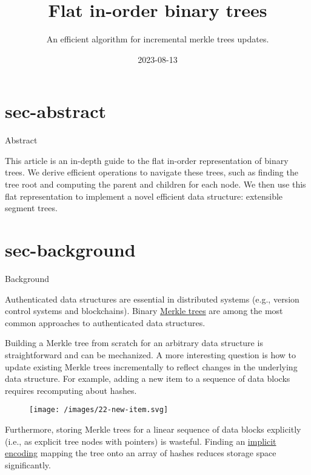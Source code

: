 \documentclass{article}
\title{Flat in-order binary trees}
\subtitle{An efficient algorithm for incremental merkle trees updates.}
\date{2023-08-13}
\begin{document}
\section{sec-abstract}{Abstract}

This article is an in-depth guide to the flat in-order representation of binary trees.
We derive efficient operations to navigate these trees, such as finding the tree root and computing the parent and children for each node.
We then use this flat representation to implement a novel efficient data structure: extensible segment trees.

\section{sec-background}{Background}

Authenticated data structures are essential in distributed systems (e.g., version control systems and blockchains).
Binary \href{https://en.wikipedia.org/wiki/Merkle_tree}{Merkle trees} are among the most common approaches to authenticated data structures.

Building a Merkle tree from scratch for an arbitrary data structure is straightforward and can be mechanized.
A more interesting question is how to update existing Merkle trees incrementally to reflect changes in the underlying data structure.
For example, adding a new item to a sequence of  data blocks requires recomputing about  hashes.

\begin{figure}[grayscale-diagram]
  \texttt{[image: /images/22-new-item.svg]}
\end{figure}

Furthermore, storing Merkle trees for a linear sequence of data blocks explicitly (i.e., as explicit tree nodes with pointers) is wasteful.
Finding an \href{https://en.wikipedia.org/wiki/Implicit_data_structure}{implicit encoding} mapping the tree onto an array of  hashes reduces storage space significantly.
\end{document}
